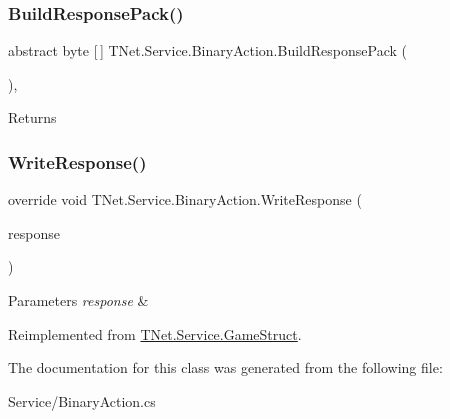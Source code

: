 \subsubsection{\texorpdfstring{Build\+Response\+Pack()}{BuildResponsePack()}}
{\footnotesize\ttfamily abstract byte \mbox{[}$\,$\mbox{]} T\+Net.\+Service.\+Binary\+Action.\+Build\+Response\+Pack (\begin{DoxyParamCaption}{ }\end{DoxyParamCaption})\hspace{0.3cm}{\ttfamily [protected]}, {}}





\begin{DoxyReturn}{Returns}

\end{DoxyReturn}
\mbox{\label{class_t_net_1_1_service_1_1_binary_action_aafac48c10d3e9601ff6a8a77555fc400}} 
\subsubsection{\texorpdfstring{Write\+Response()}{WriteResponse()}}
{\footnotesize\ttfamily override void T\+Net.\+Service.\+Binary\+Action.\+Write\+Response (\begin{DoxyParamCaption}\item[{\mbox{\hyperlink{class_t_net_1_1_service_1_1_base_game_response}{Base\+Game\+Response}}}]{response }\end{DoxyParamCaption})\hspace{0.3cm}{\ttfamily [virtual]}}






\begin{DoxyParams}{Parameters}
{\em response} & \\
\hline
\end{DoxyParams}


Reimplemented from \mbox{\hyperlink{class_t_net_1_1_service_1_1_game_struct_a1e9ea47b126ecae6d9b7e1c813d053b2}{T\+Net.\+Service.\+Game\+Struct}}.



The documentation for this class was generated from the following file\+:\begin{DoxyCompactItemize}
\item 
Service/Binary\+Action.\+cs\end{DoxyCompactItemize}
